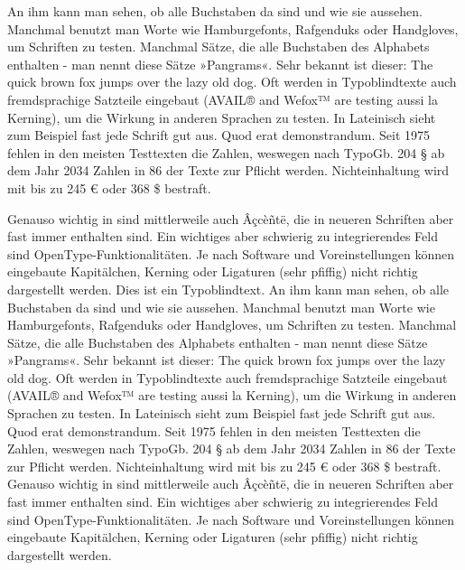 An ihm kann man sehen, ob alle Buchstaben da sind und wie sie aussehen. Manchmal benutzt man Worte wie Hamburgefonts, Rafgenduks oder Handgloves, um Schriften zu testen. Manchmal Sätze, die alle Buchstaben des Alphabets enthalten - man nennt diese Sätze »Pangrams«. Sehr bekannt ist dieser: The quick brown fox jumps over the lazy old dog. Oft werden in Typoblindtexte auch fremdsprachige Satzteile eingebaut (AVAIL® and Wefox™ are testing aussi la Kerning), um die Wirkung in anderen Sprachen zu testen. In Lateinisch sieht zum Beispiel fast jede Schrift gut aus. Quod erat demonstrandum. Seit 1975 fehlen in den meisten Testtexten die Zahlen, weswegen nach TypoGb. 204 § ab dem Jahr 2034 Zahlen in 86 der Texte zur Pflicht werden. Nichteinhaltung wird mit bis zu 245 € oder 368 \$ bestraft.

Genauso wichtig in sind mittlerweile auch Âçcèñtë, die in neueren Schriften aber fast immer enthalten sind. Ein wichtiges aber schwierig zu integrierendes Feld sind OpenType-Funktionalitäten. Je nach Software und Voreinstellungen können eingebaute Kapitälchen, Kerning oder Ligaturen (sehr pfiffig) nicht richtig dargestellt werden. Dies ist ein Typoblindtext. An ihm kann man sehen, ob alle Buchstaben da sind und wie sie aussehen. Manchmal benutzt man Worte wie Hamburgefonts, Rafgenduks oder Handgloves, um Schriften zu testen. Manchmal Sätze, die alle Buchstaben des Alphabets enthalten - man nennt diese Sätze »Pangrams«. Sehr bekannt ist dieser: The quick brown fox jumps over the lazy old dog. Oft werden in Typoblindtexte auch fremdsprachige Satzteile eingebaut (AVAIL® and Wefox™ are testing aussi la Kerning), um die Wirkung in anderen Sprachen zu testen. In Lateinisch sieht zum Beispiel fast jede Schrift gut aus. Quod erat demonstrandum. Seit 1975 fehlen in den meisten Testtexten die Zahlen, weswegen nach TypoGb. 204 § ab dem Jahr 2034 Zahlen in 86 der Texte zur Pflicht werden. Nichteinhaltung wird mit bis zu 245 € oder 368 \$ bestraft. Genauso wichtig in sind mittlerweile auch Âçcèñtë, die in neueren Schriften aber fast immer enthalten sind. Ein wichtiges aber schwierig zu integrierendes Feld sind OpenType-Funktionalitäten. Je nach Software und Voreinstellungen können eingebaute Kapitälchen, Kerning oder Ligaturen (sehr pfiffig) nicht richtig dargestellt werden.
